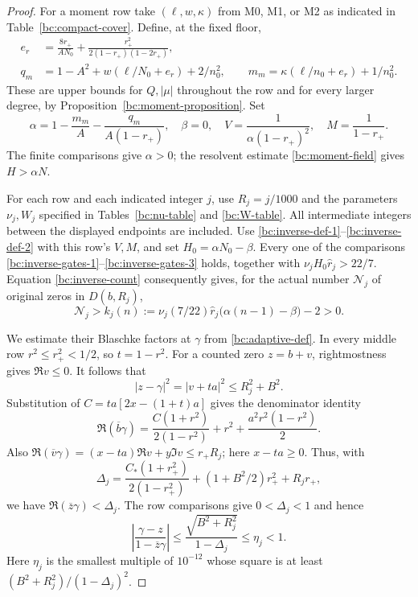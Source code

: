 \begin{proof}
For a moment row take $(\ell,w,\kappa)$ from M0, M1, or M2 as
indicated in Table~\ref{bc:compact-cover}.  Define, at the fixed floor,
\begin{align}
 e_r&=\frac{8r_+}{AN_0}
            +\frac{r_+^2}{2(1-r_+)(1-2r_+)},\nonumber\\
 q_m&=1-A^2+w(\ell/N_0+e_r)+2/n_0^2,\qquad
 m_m=\kappa(\ell/n_0+e_r)+1/n_0^2.                \label{bc:compact-moments}
\end{align}
These are upper bounds for $Q,|\mu|$ throughout the row
and for every larger degree, by Proposition~\ref{bc:moment-proposition}.
Set
\begin{equation}\label{bc:compact-moment-field}
 \alpha=1-\frac{m_m}A-\frac{q_m}{A(1-r_+)},\quad
 \beta=0,\quad V=\frac1{\alpha(1-r_+)^2},\quad
 M=\frac1{1-r_+}.
\end{equation}
The finite comparisons give $\alpha>0$; the resolvent estimate
\eqref{bc:moment-field} gives $H>\alpha N$.

For each row and each indicated integer $j$, use $R_j=j/1000$ and
the parameters $\nu_j,W_j$ specified in
Tables~\ref{bc:nu-table} and \ref{bc:W-table}.
All intermediate integers between the displayed endpoints are included.
Use \eqref{bc:inverse-def-1}--\eqref{bc:inverse-def-2} with this row's
$V,M$, and set $H_0=\alpha N_0-\beta$.
Every one of the comparisons
\eqref{bc:inverse-gates-1}--\eqref{bc:inverse-gates-3} holds, together
with $\nu_jH_0\widehat r_j>22/7$.
Equation \eqref{bc:inverse-count} consequently gives, for the actual
number $\mathcal N_j$ of original zeros in $D(b,R_j)$,
\begin{equation}\label{bc:nested-count}
 \mathcal N_j>k_j(n):=
      \nu_j(7/22)\widehat r_j\bigl(\alpha(n-1)-\beta\bigr)-2>0.
\end{equation}

We estimate their Blaschke factors at $\gamma$ from
\eqref{bc:adaptive-def}.  In every middle row
$r^2\leq r_+^2<1/2$, so $t=1-r^2$.
For a counted zero $z=b+v$, rightmostness gives $\Re v\leq0$.
It follows that
\[
 |z-\gamma|^2=|v+ta|^2\leq R_j^2+B^2.
\]
Substitution of $C=ta[2x-(1+t)a]$ gives the denominator identity
\begin{equation}\label{bc:correlated-denominator}
 \Re(\overline b\gamma)
 =\frac{C(1+r^2)}{2(1-r^2)}
        +r^2+\frac{a^2r^2(1-r^2)}2.
\end{equation}
Also
$\Re(\overline v\gamma)=(x-ta)\Re v+y\Im v\leq r_+R_j$;
here $x-ta\geq0$.  Thus, with
\begin{equation}\label{bc:Delta-def}
 \Delta_j=
 \frac{C_*(1+r_+^2)}{2(1-r_+^2)}
       +(1+B^2/2)r_+^2+R_jr_+,
\end{equation}
we have $\Re(\overline z\gamma)<\Delta_j$.
The row comparisons give $0<\Delta_j<1$ and hence
\begin{equation}\label{bc:factor-bound}
 \left|\frac{\gamma-z}{1-\overline z\gamma}\right|
 \leq\frac{\sqrt{B^2+R_j^2}}{1-\Delta_j}\leq\eta_j<1.
\end{equation}
Here $\eta_j$ is the smallest multiple of $10^{-12}$ whose square is
at least $(B^2+R_j^2)/(1-\Delta_j)^2$.


\end{proof}
